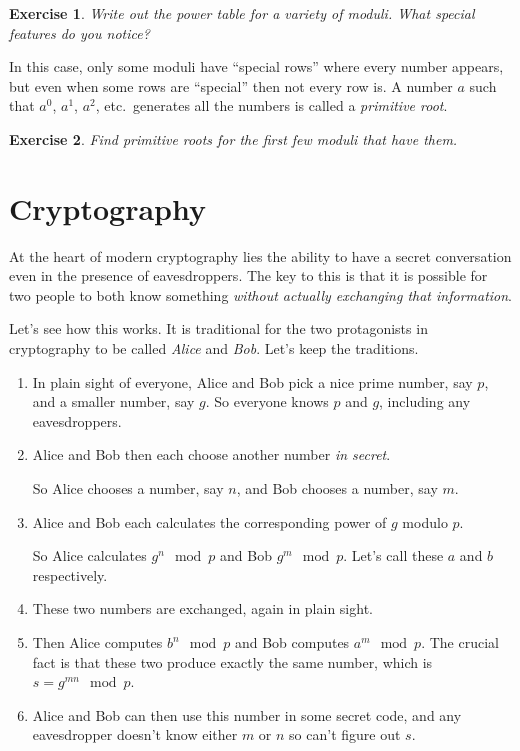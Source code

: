\documentclass[
  html5,
  mathml,
  use filename
]{internet}
\newtheorem{exercise}{Exercise}
\begin{document}
\begin{exercise}
Write out the power table for a variety of moduli.
What special features do you notice?
\end{exercise}

In this case, only some moduli have ``special rows'' where every number appears, but even when some rows are ``special'' then not every row is.
A number \(a\) such that \(a^0\), \(a^1\), \(a^2\), etc.\ generates all the numbers is called a \emph{primitive root}.

\begin{exercise}
Find primitive roots for the first few moduli that have them.
\end{exercise}

\section{Cryptography}

At the heart of modern cryptography lies the ability to have a secret conversation even in the presence of eavesdroppers.
The key to this is that it is possible for two people to both know something \emph{without actually exchanging that information}.

Let's see how this works.
It is traditional for the two protagonists in cryptography to be called \emph{Alice} and \emph{Bob}.
Let's keep the traditions.

\begin{enumerate}
\item In plain sight of everyone, Alice and Bob pick a nice prime number, say \(p\), and a smaller number, say \(g\).
So everyone knows \(p\) and \(g\), including any eavesdroppers.

\item Alice and Bob then each choose another number \emph{in secret}.

So Alice chooses a number, say \(n\), and Bob chooses a number, say \(m\).

\item Alice and Bob each calculates the corresponding power of \(g\) modulo \(p\).

So Alice calculates \(g^n \mod p\) and Bob \(g^m \mod p\).
Let's call these \(a\) and \(b\) respectively.

\item These two numbers are exchanged, again in plain sight.

\item Then Alice computes \(b^n \mod p\) and Bob computes \(a^m \mod p\).
The crucial fact is that these two produce exactly the same number, which is \(s = g^{m n} \mod p\).

\item Alice and Bob can then use this number in some secret code, and any eavesdropper doesn't know either \(m\) or \(n\) so can't figure out \(s\).
\end{enumerate}
\end{document}
